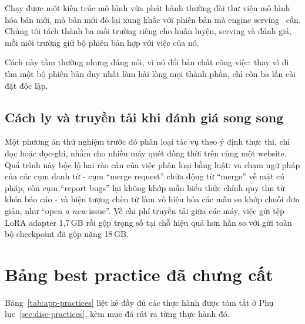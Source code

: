 Chạy được một kiến trúc mô hình vừa phát hành thường đòi thư viện mô hình hóa bản mới, mà bản mới đó lại xung khắc với phiên bản mà engine serving~\cite{kwon2023vllm} cần. Chúng tôi tách thành ba môi trường riêng cho huấn luyện, serving và đánh giá, mỗi môi trường giữ bộ phiên bản hợp với việc của nó.

Cách này tầm thường nhưng đáng nói, vì nó đổi bản chất công việc: thay vì đi tìm một bộ phiên bản duy nhất làm hài lòng mọi thành phần, chỉ còn ba lần cài đặt độc lập.


\subsection*{Cách ly và truyền tải khi đánh giá song song}

Một phương án thử nghiệm trước đó phân loại tác vụ theo ý định thực thi, chỉ
đọc hoặc đọc-ghi, nhằm cho nhiều máy quét đồng thời trên cùng một website. Quá
trình này bộc lộ hai rào cản của việc phân loại bằng luật: va chạm ngữ pháp của
các cụm danh từ - cụm ``merge request'' chứa động từ ``merge'' về mặt cú pháp,
còn cụm ``report bugs'' lại không khớp mẫu biểu thức chính quy tìm từ khóa báo
cáo - và hiện tượng chèn từ làm vô hiệu hóa các mẫu so khớp chuỗi đơn giản, như
``open \emph{a new} issue''. Về chi phí truyền tải giữa các máy, việc gửi tệp
LoRA adapter 1{,}7\,GB rồi gộp trọng số tại chỗ hiệu quả hơn hẳn so với gửi
toàn bộ checkpoint đã gộp nặng 18\,GB.


\section{Bảng best practice đã chưng cất}
\label{app:practices}

Bảng~\ref{tab:app-practices} liệt kê đầy đủ các thực hành được tóm tắt ở
Phụ lục~\ref{sec:disc-practices}, kèm mục đã rút ra từng thực hành đó.

